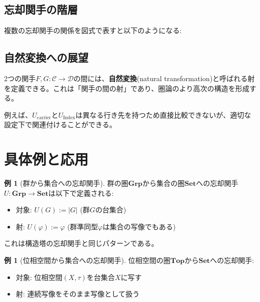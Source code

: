\documentclass[a4paper,12pt]{article}
\theoremstyle{definition}
\newtheorem{example}[definition]{例}
\begin{document}
\subsection{忘却関手の階層}

複数の忘却関手の関係を図式で表すと以下のようになる:

\begin{center}
\end{center}

\subsection{自然変換への展望}

2つの関手$F, G : \mathcal{C} \to \mathcal{D}$の間には、\textbf{自然変換}(natural transformation)と呼ばれる射を定義できる。これは「関手の間の射」であり、圏論のより高次の構造を形成する。

例えば、$U_{\text{carrier}}$と$U_{\text{Index}}$は異なる行き先を持つため直接比較できないが、適切な設定下で関連付けることができる。

\section{具体例と応用}

\begin{example}[群から集合への忘却関手]
群の圏$\mathbf{Grp}$から集合の圏$\mathbf{Set}$への忘却関手$U : \mathbf{Grp} \to \mathbf{Set}$は以下で定義される:
\begin{itemize}
\item 対象: $U(G) := |G|$ (群$G$の台集合)
\item 射: $U(\varphi) := \varphi$ (群準同型$\varphi$は集合の写像でもある)
\end{itemize}
これは構造塔の忘却関手と同じパターンである。
\end{example}

\begin{example}[位相空間から集合への忘却関手]
位相空間の圏$\mathbf{Top}$から$\mathbf{Set}$への忘却関手:
\begin{itemize}
\item 対象: 位相空間$(X, \tau)$を台集合$X$に写す
\item 射: 連続写像をそのまま写像として扱う
\end{itemize}
\end{example}
\end{document}
